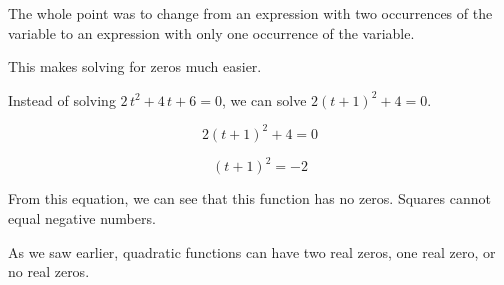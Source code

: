 \documentclass{ximera}
\begin{document}
The whole point was to change from an expression with two occurrences of the variable to an expression with only one occurrence of the variable. 

This makes solving for zeros much easier. 

Instead of solving $2 \, t^2 + 4 \, t + 6 = 0$, we can solve $2 (t+1)^2 + 4 = 0$.


\[
2 (t+1)^2 + 4 = 0
\]


\[
(t+1)^2 = -2
\]


From this equation, we can see that this function has no zeros. Squares cannot equal negative numbers.


As we saw earlier, quadratic functions can have two real zeros, one real zero, or no real zeros. 
\end{document}
